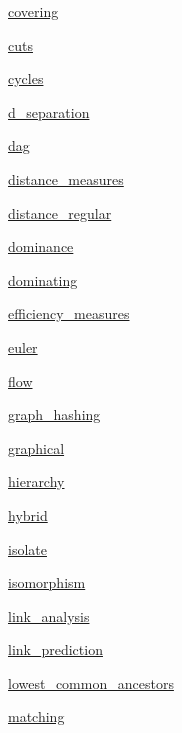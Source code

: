 \begin{DoxyCompactItemize}
 \hyperlink{namespacenetworkx_1_1algorithms_1_1covering}{covering}
\item 
 \hyperlink{namespacenetworkx_1_1algorithms_1_1cuts}{cuts}
\item 
 \hyperlink{namespacenetworkx_1_1algorithms_1_1cycles}{cycles}
\item 
 \hyperlink{namespacenetworkx_1_1algorithms_1_1d__separation}{d\+\_\+separation}
\item 
 \hyperlink{namespacenetworkx_1_1algorithms_1_1dag}{dag}
\item 
 \hyperlink{namespacenetworkx_1_1algorithms_1_1distance__measures}{distance\+\_\+measures}
\item 
 \hyperlink{namespacenetworkx_1_1algorithms_1_1distance__regular}{distance\+\_\+regular}
\item 
 \hyperlink{namespacenetworkx_1_1algorithms_1_1dominance}{dominance}
\item 
 \hyperlink{namespacenetworkx_1_1algorithms_1_1dominating}{dominating}
\item 
 \hyperlink{namespacenetworkx_1_1algorithms_1_1efficiency__measures}{efficiency\+\_\+measures}
\item 
 \hyperlink{namespacenetworkx_1_1algorithms_1_1euler}{euler}
\item 
 \hyperlink{namespacenetworkx_1_1algorithms_1_1flow}{flow}
\item 
 \hyperlink{namespacenetworkx_1_1algorithms_1_1graph__hashing}{graph\+\_\+hashing}
\item 
 \hyperlink{namespacenetworkx_1_1algorithms_1_1graphical}{graphical}
\item 
 \hyperlink{namespacenetworkx_1_1algorithms_1_1hierarchy}{hierarchy}
\item 
 \hyperlink{namespacenetworkx_1_1algorithms_1_1hybrid}{hybrid}
\item 
 \hyperlink{namespacenetworkx_1_1algorithms_1_1isolate}{isolate}
\item 
 \hyperlink{namespacenetworkx_1_1algorithms_1_1isomorphism}{isomorphism}
\item 
 \hyperlink{namespacenetworkx_1_1algorithms_1_1link__analysis}{link\+\_\+analysis}
\item 
 \hyperlink{namespacenetworkx_1_1algorithms_1_1link__prediction}{link\+\_\+prediction}
\item 
 \hyperlink{namespacenetworkx_1_1algorithms_1_1lowest__common__ancestors}{lowest\+\_\+common\+\_\+ancestors}
\item 
 \hyperlink{namespacenetworkx_1_1algorithms_1_1matching}{matching}

\end{DoxyCompactItemize}
